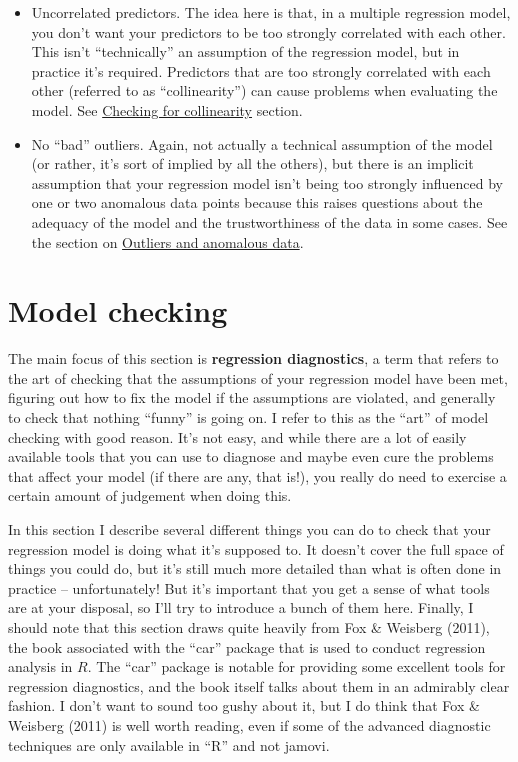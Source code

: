 \documentclass[
  a4paper,
]{book}
\providecommand{\tightlist}{%
  \setlength{\itemsep}{0pt}\setlength{\parskip}{0pt}}\usepackage{longtable,booktabs,array}
\begin{document}
\begin{itemize}
\tightlist
\item
  Uncorrelated predictors. The idea here is that, in a multiple
  regression model, you don't want your predictors to be too strongly
  correlated with each other. This isn't ``technically'' an assumption
  of the regression model, but in practice it's required. Predictors
  that are too strongly correlated with each other (referred to as
  ``collinearity'') can cause problems when evaluating the model. See
  \protect\hyperlink{checking-for-collinearity}{Checking for
  collinearity} section.
\item
  No ``bad'' outliers. Again, not actually a technical assumption of the
  model (or rather, it's sort of implied by all the others), but there
  is an implicit assumption that your regression model isn't being too
  strongly influenced by one or two anomalous data points because this
  raises questions about the adequacy of the model and the
  trustworthiness of the data in some cases. See the section on
  \protect\hyperlink{outliers-and-anomalous-data}{Outliers and anomalous
  data}.
\end{itemize}

\hypertarget{sec-Model-checking}{%
\section{Model checking}\label{sec-Model-checking}}

The main focus of this section is \textbf{regression diagnostics}, a
term that refers to the art of checking that the assumptions of your
regression model have been met, figuring out how to fix the model if the
assumptions are violated, and generally to check that nothing ``funny''
is going on. I refer to this as the ``art'' of model checking with good
reason. It's not easy, and while there are a lot of easily available
tools that you can use to diagnose and maybe even cure the problems that
affect your model (if there are any, that is!), you really do need to
exercise a certain amount of judgement when doing this.

In this section I describe several different things you can do to check
that your regression model is doing what it's supposed to. It doesn't
cover the full space of things you could do, but it's still much more
detailed than what is often done in practice -- unfortunately! But it's
important that you get a sense of what tools are at your disposal, so
I'll try to introduce a bunch of them here. Finally, I should note that
this section draws quite heavily from Fox \& Weisberg (2011), the book
associated with the ``car'' package that is used to conduct regression
analysis in \(R\). The ``car'' package is notable for providing some
excellent tools for regression diagnostics, and the book itself talks
about them in an admirably clear fashion. I don't want to sound too
gushy about it, but I do think that Fox \& Weisberg (2011) is well worth
reading, even if some of the advanced diagnostic techniques are only
available in ``R'' and not jamovi.
\end{document}
